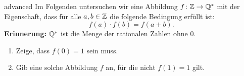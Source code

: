 \documentclass[../abbildungen.tex]{subfiles}
\begin{document}
\begin{exercise}{advanced}
    Im Folgenden untersuchen wir eine Abbildung $f\colon\mathbb{Z}\rightarrow\mathbb{Q}^*$ mit der Eigenschaft, dass für alle $a,b\in\mathbb{Z}$ die folgende Bedingung erfüllt ist:\[f(a)\cdot f(b)=f(a+b).\]
    \textbf{Erinnerung:} $\mathbb{Q}^*$ ist die Menge der rationalen Zahlen ohne $0$.
    \begin{enumerate}
        \item Zeige, dass $f(0)=1$ sein muss.
        \item Gib eine solche Abbildung $f$ an, für die nicht $f(1)=1$ gilt.
        
    \end{enumerate}
\end{exercise}
\end{document}
